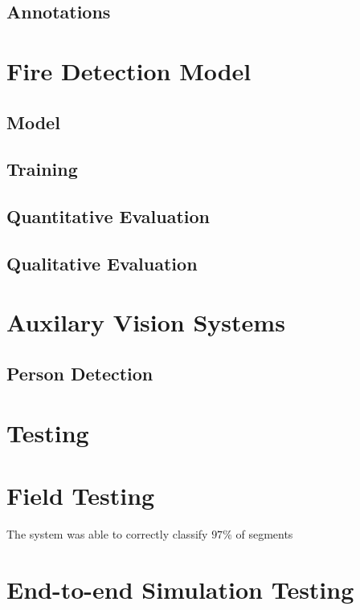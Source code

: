   \subsection{Annotations}

\section{Fire Detection Model}\label{sec:detection}

  \subsection{Model}\label{sec:model}

  \subsection{Training}\label{sec:model}
    
  \subsection{Quantitative Evaluation}\label{sec:eval}

  \subsection{Qualitative Evaluation}\label{sec:gradcam}

\section{Auxilary Vision Systems}\label{sec:other}

  \subsection{Person Detection}

\section{Testing}

  \section{Field Testing}

  The system was able to correctly classify $97\%$ of segments

  \section{End-to-end Simulation Testing}

